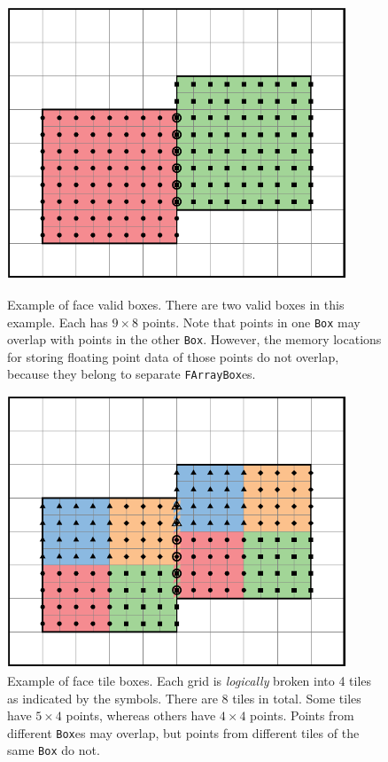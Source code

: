 {{\begin{figure}
  \centering
  \begin{minipage}{0.45\textwidth}
    \centering
    \includegraphics[width=0.9\textwidth]{./Basics/ec_validbox.pdf}
    \caption{\label{fig:basics:ec_validbox} Example of face valid
      boxes. There are two valid boxes in this example. Each has $9
      \times 8$ points.  Note that points in one {\tt Box} may overlap
      with points in the other {\tt Box}.  However, the memory locations
      for storing floating point data of those points do not overlap,
      because they belong to separate {\tt FArrayBox}es.}
  \end{minipage}\hfill
  \begin{minipage}{0.45\textwidth}
    \centering
    \includegraphics[width=0.9\textwidth]{./Basics/ec_tilebox.pdf}
    \caption{\label{fig:basics:ec_tilebox} Example of face tile boxes.
      Each grid is {\emph{logically}} broken into 4 tiles as indicated
      by the symbols.  There are 8 tiles in total.  Some tiles have $5
      \times 4$ points, whereas others have $4 \times 4$ points.
      Points from different {\tt Box}es may overlap, but points from
      different tiles of the same {\tt Box} do not.}
  \end{minipage}
\end{figure}

}}
